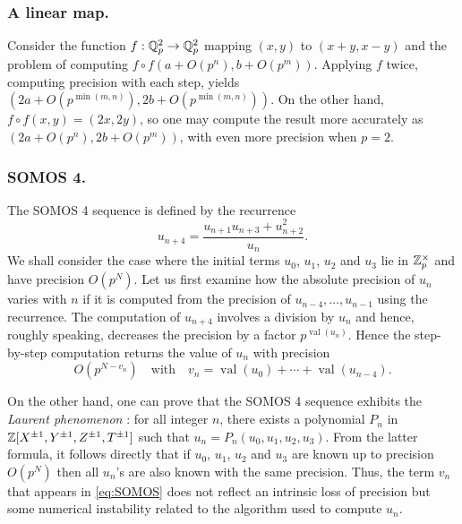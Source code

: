 \documentclass{lms}
\DeclareMathOperator{\val}{val}
\begin{document}
\subsubsection*{A linear map.}

Consider the function $f : \mathbb Q_p^2 \to \mathbb Q_p^2$ mapping $(x,y)$ to $(x+y, x-y)$ and the problem
of computing $f \circ f(a + O(p^n), b + O(p^m))$.  Applying $f$ twice, computing precision
with each step, yields $\left(2a + O(p^{\min(m,n)}), 2b + O(p^{\min(m, n)})\right)$.
On the other hand, $f \circ f(x,y) = (2x, 2y)$, so one may compute the result more
accurately as $(2a + O(p^n), 2b + O(p^m))$, with even more precision when $p=2$.

\subsubsection*{SOMOS 4.}

The SOMOS 4 sequence \cite{somos:89a} is defined by the recurrence
\[
u_{n+4} = \frac{u_{n+1} u_{n+3} + u_{n+2}^2}{u_n}.
\]
We shall consider the case where the initial
terms $u_0$, $u_1$, $u_2$ and $u_3$ lie in $\mathbb Z_p^\times$ and have precision $O(p^N)$.
Let us first examine how the absolute precision of $u_n$ varies with $n$
if it is computed from the precision of $u_{n-4}, \ldots, u_{n-1}$ using the recurrence.
The computation of $u_{n+4}$ involves a division by $u_n$ and hence, roughly speaking,
decreases the precision by a factor $p^{\val(u_n)}$.  Hence the
step-by-step computation returns the value of $u_n$ with precision
\begin{equation}
\label{eq:SOMOS}
O(p^{N-v_n})
\quad \text{with}\quad
v_n = \val(u_0) + \cdots + \val(u_{n-4}).
\end{equation}

On the other hand, one can prove that the SOMOS 4 sequence 
exhibits the \emph{Laurent phenomenon} \cite{fomin-zelevinsky:02a}: for all integer 
$n$, there exists a polynomial $P_n$ in $\mathbb Z[X^{\pm 1}, Y^{\pm 1}, Z^{\pm 
1}, T^{\pm 1}]$ such that $u_n = P_n(u_0, u_1, u_2, u_3)$.
From the latter formula, it follows directly that if $u_0$, $u_1$,
$u_2$ and $u_3$ are known up to precision $O(p^N)$ then all $u_n$'s
are also known with the same precision. Thus, the term $v_n$ that 
appears in \eqref{eq:SOMOS} does not reflect an intrinsic loss of
precision but some numerical instability related to the algorithm used to compute $u_n$.
\end{document}
